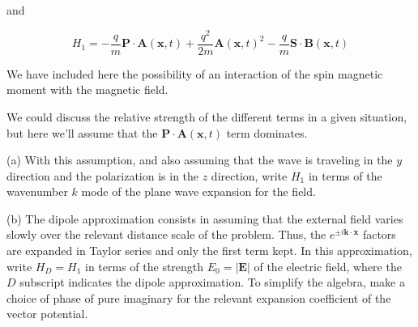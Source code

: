 \documentclass[12pt]{article}
\begin{document}
and

$$
H_{1}=-\frac{q}{m} \mathbf{P} \cdot \mathbf{A}(\mathbf{x}, t)+\frac{q^{2}}{2 m} \mathbf{A}(\mathbf{x}, t)^{2}-\frac{q}{m} \mathbf{S} \cdot \mathbf{B}(\mathbf{x}, t)
$$

We have included here the possibility of an interaction of the spin magnetic moment with the magnetic field.

We could discuss the relative strength of the different terms in a given situation, but here we'll assume that the $\mathbf{P} \cdot \mathbf{A}(\mathbf{x}, t)$ term dominates.

(a) With this assumption, and also assuming that the wave is traveling in the $y$ direction and the polarization is in the $z$ direction, write $H_{1}$ in terms of the wavenumber $k$ mode of the plane wave expansion for the field.

(b) The dipole approximation consists in assuming that the external field varies slowly over the relevant distance scale of the problem. Thus, the $e^{ \pm i \mathbf{k} \cdot \mathbf{x}}$ factors are expanded in Taylor series and only the first term kept. In this approximation, write $H_{D}=H_{1}$ in terms of the strength $E_{0}=|\mathbf{E}|$ of the electric field, where the $D$ subscript indicates the dipole approximation. To simplify the algebra, make a choice of phase of pure imaginary for the relevant expansion coefficient of the vector potential.
\end{document}
